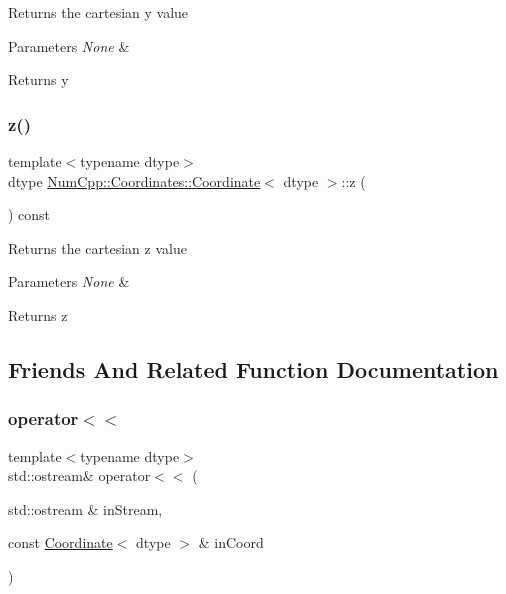 Returns the cartesian y value


\begin{DoxyParams}{Parameters}
{\em None} & \\
\hline
\end{DoxyParams}
\begin{DoxyReturn}{Returns}
y 
\end{DoxyReturn}
\mbox{\label{class_num_cpp_1_1_coordinates_1_1_coordinate_a1ae1746da7602f619eef958552ffd743}} 
\subsubsection{\texorpdfstring{z()}{z()}}
{\footnotesize\ttfamily template$<$typename dtype$>$ \\
dtype \mbox{\hyperlink{class_num_cpp_1_1_coordinates_1_1_coordinate}{Num\+Cpp\+::\+Coordinates\+::\+Coordinate}}$<$ dtype $>$\+::z (\begin{DoxyParamCaption}{ }\end{DoxyParamCaption}) const\hspace{0.3cm}{\ttfamily [inline]}}

Returns the cartesian z value


\begin{DoxyParams}{Parameters}
{\em None} & \\
\hline
\end{DoxyParams}
\begin{DoxyReturn}{Returns}
z 
\end{DoxyReturn}


\subsection{Friends And Related Function Documentation}
\mbox{\label{class_num_cpp_1_1_coordinates_1_1_coordinate_aa5a56295ef46edb54bf7fdafb169c081}} 
\subsubsection{\texorpdfstring{operator$<$$<$}{operator<<}}
{\footnotesize\ttfamily template$<$typename dtype$>$ \\
std\+::ostream\& operator$<$$<$ (\begin{DoxyParamCaption}\item[{std\+::ostream \&}]{in\+Stream,  }\item[{const \mbox{\hyperlink{class_num_cpp_1_1_coordinates_1_1_coordinate}{Coordinate}}$<$ dtype $>$ \&}]{in\+Coord }\end{DoxyParamCaption})\hspace{0.3cm}{\ttfamily [friend]}}

